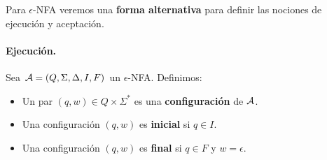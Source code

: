 
Para $\epsilon$-NFA veremos una \textbf{forma alternativa} para definir las nociones de ejecución y aceptación.

\paragraph{Ejecución.} Sea $\mathcal{A} = (Q,\Sigma,\Delta, I, F)$ un $\epsilon$-NFA. Definimos:
\begin{itemize}
    \item Un par $(q,w) \in Q \times \Sigma^*$ es una \textbf{configuración} de $\mathcal{A}$.
    \item Una configuración $(q,w)$ es \textbf{inicial} si $q \in I$.
    \item Una configuración $(q,w)$ es \textbf{final} si $q \in F$ y $w = \epsilon$.
\end{itemize}

